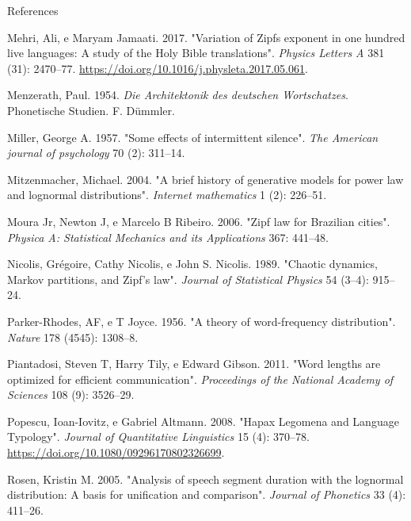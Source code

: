 \documentclass[
  ignorenonframetext,
  aspectratio=169]{beamer}
\newlength{\cslhangindent}
\newlength{\cslentryspacingunit} %
\newenvironment{CSLReferences}[2] %
 {%
  \setlength{\parindent}{0pt}
  \ifodd #1
  \let\oldpar\par
  \def\par{\hangindent=\cslhangindent\oldpar}
  \fi
  \setlength{\parskip}{#2\cslentryspacingunit}
 }%
 {}
\begin{document}
\begin{frame}[allowframebreaks]{References}
\begin{CSLReferences}{1}{0}
\leavevmode{}%
Mehri, Ali, e Maryam Jamaati. 2017. {"Variation of
Zipf{\textquotesingle}s exponent in one hundred live languages: A study
of the Holy Bible translations"}. \emph{Physics Letters A} 381 (31):
2470--77. \url{https://doi.org/10.1016/j.physleta.2017.05.061}.

\leavevmode{}%
Menzerath, Paul. 1954. \emph{Die Architektonik des deutschen
Wortschatzes}. Phonetische Studien. F. D{ü}mmler.

\leavevmode{}%
Miller, George A. 1957. {"Some effects of intermittent silence"}.
\emph{The American journal of psychology} 70 (2): 311--14.

\leavevmode{}%
Mitzenmacher, Michael. 2004. {"A brief history of generative models for
power law and lognormal distributions"}. \emph{Internet mathematics} 1
(2): 226--51.

\leavevmode{}%
Moura Jr, Newton J, e Marcelo B Ribeiro. 2006. {"Zipf law for Brazilian
cities"}. \emph{Physica A: Statistical Mechanics and its Applications}
367: 441--48.

\leavevmode{}%
Nicolis, Grégoire, Cathy Nicolis, e John S. Nicolis. 1989. {"Chaotic
dynamics, {Markov} partitions, and {Zipf}'s law"}. \emph{Journal of
Statistical Physics} 54 (3--4): 915--24.

\leavevmode{}%
Parker-Rhodes, AF, e T Joyce. 1956. {"A theory of word-frequency
distribution"}. \emph{Nature} 178 (4545): 1308--8.

\leavevmode{}%
Piantadosi, Steven T, Harry Tily, e Edward Gibson. 2011. {"Word lengths
are optimized for efficient communication"}. \emph{Proceedings of the
National Academy of Sciences} 108 (9): 3526--29.

\leavevmode{}%
Popescu, Ioan-Iovitz, e Gabriel Altmann. 2008. {"Hapax Legomena and
Language Typology"}. \emph{Journal of Quantitative Linguistics} 15 (4):
370--78. \url{https://doi.org/10.1080/09296170802326699}.

\leavevmode{}%
Rosen, Kristin M. 2005. {"Analysis of speech segment duration with the
lognormal distribution: A basis for unification and comparison"}.
\emph{Journal of Phonetics} 33 (4): 411--26.


\end{CSLReferences}
\end{frame}
\end{document}
